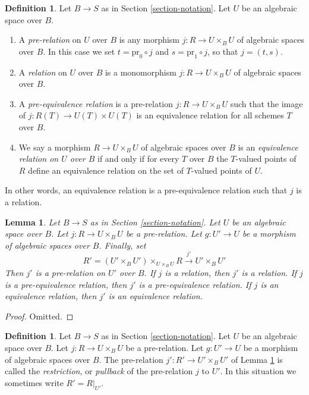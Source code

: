 \documentclass{stacks-project}
\theoremstyle{plain}
\newtheorem{lemma}[subsection]{Lemma}
\theoremstyle{definition}
\newtheorem{definition}[subsection]{Definition}
\theoremstyle{remark}
\numberwithin{equation}{subsection}
\begin{document}
\begin{definition}
\label{definition-equivalence-relation}
Let $B \to S$ as in Section \ref{section-notation}.
Let $U$ be an algebraic space over $B$.
\begin{enumerate}
\item A {\it pre-relation} on $U$ over $B$ is any morphism
$j : R \to U \times_B U$ of algebraic spaces over $B$.
In this case we set
$t = \text{pr}_0 \circ j$ and $s = \text{pr}_1 \circ j$, so
that $j = (t, s)$.
\item A {\it relation} on $U$ over $B$ is a monomorphism
$j : R \to U \times_B U$ of algebraic spaces over $B$.
\item A {\it pre-equivalence relation} is a pre-relation
$j : R \to U \times_B U$ such that the image of
$j : R(T) \to U(T) \times U(T)$ is an equivalence relation for
all schemes $T$ over $B$.
\item We say a morphism $R \to U \times_B U$ of algebraic spaces over $B$
is an {\it equivalence relation on $U$ over $B$}
if and only if for every $T$ over $B$ the $T$-valued
points of $R$ define an equivalence relation
on the set of $T$-valued points of $U$.
\end{enumerate}
\end{definition}

\noindent
In other words, an equivalence relation is a pre-equivalence relation
such that $j$ is a relation.

\begin{lemma}
\label{lemma-restrict-relation}
Let $B \to S$ as in Section \ref{section-notation}.
Let $U$ be an algebraic space over $B$.
Let $j : R \to U \times_B U$ be a pre-relation.
Let $g : U' \to U$ be a morphism of algebraic spaces over $B$.
Finally, set
$$
R' = (U' \times_B U')\times_{U \times_B U} R
\xrightarrow{j'}
U' \times_B U'
$$
Then $j'$ is a pre-relation on $U'$ over $B$.
If $j$ is a relation, then $j'$ is a relation.
If $j$ is a pre-equivalence relation, then $j'$ is a pre-equivalence relation.
If $j$ is an equivalence relation, then $j'$ is an equivalence relation.
\end{lemma}

\begin{proof}
Omitted.
\end{proof}

\begin{definition}
\label{definition-restrict-relation}
Let $B \to S$ as in Section \ref{section-notation}.
Let $U$ be an algebraic space over $B$.
Let $j : R \to U \times_B U$ be a pre-relation.
Let $g : U' \to U$ be a morphism of algebraic spaces over $B$.
The pre-relation $j' : R' \to U' \times_B U'$ of
Lemma \ref{lemma-restrict-relation} is called
the {\it restriction}, or {\it pullback} of the pre-relation $j$ to $U'$.
In this situation we sometimes write $R' = R|_{U'}$.
\end{definition}
\end{document}
